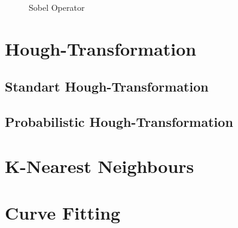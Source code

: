 \begin{figure}[H]
  \centering
  \hfill
  \caption{Sobel Operator}
\end{figure}




%
\section{Hough-Transformation}\label{sec:Hough-Transformation}
%

%
\subsection{Standart Hough-Transformation}\label{sec:Standart Hough - Transformation}
%


%
\subsection{Probabilistic Hough-Transformation}\label{sec:Probabilistic Hough-Transformation}
%




%
\section{K-Nearest Neighbours}\label{sec:K-Nearest Neighbors}
%



%
\section{Curve Fitting}\label{sec:Curve Fitting}
%

%




